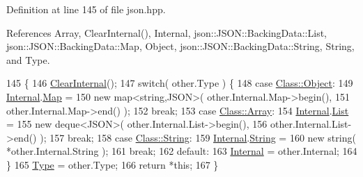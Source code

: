 Definition at line 145 of file json.\+hpp.



References Array, Clear\+Internal(), Internal, json\+::\+J\+S\+O\+N\+::\+Backing\+Data\+::\+List, json\+::\+J\+S\+O\+N\+::\+Backing\+Data\+::\+Map, Object, json\+::\+J\+S\+O\+N\+::\+Backing\+Data\+::\+String, String, and Type.


\begin{DoxyCode}
145                                              \{
146             \mbox{\hyperlink{classjson_1_1_j_s_o_n_afefdc8c18c2c40575c2c8463fbd78c67}{ClearInternal}}();
147             \textcolor{keywordflow}{switch}( other.Type ) \{
148             \textcolor{keywordflow}{case} \mbox{\hyperlink{classjson_1_1_j_s_o_n_a762f55df6d407c1af61607ed516ffe07a497031794414a552435f90151ac3b54b}{Class::Object}}:
149                 \mbox{\hyperlink{classjson_1_1_j_s_o_n_a1e2a064794c3d55c8bb8887fc5734947}{Internal}}.\mbox{\hyperlink{unionjson_1_1_j_s_o_n_1_1_backing_data_ab2e19b00745b37d2add157ff3a35c431}{Map}} = 
150                     \textcolor{keyword}{new} map<string,JSON>( other.Internal.Map->begin(),
151                                           other.Internal.Map->end() );
152                 \textcolor{keywordflow}{break};
153             \textcolor{keywordflow}{case} \mbox{\hyperlink{classjson_1_1_j_s_o_n_a762f55df6d407c1af61607ed516ffe07a4410ec34d9e6c1a68100ca0ce033fb17}{Class::Array}}:
154                 \mbox{\hyperlink{classjson_1_1_j_s_o_n_a1e2a064794c3d55c8bb8887fc5734947}{Internal}}.\mbox{\hyperlink{unionjson_1_1_j_s_o_n_1_1_backing_data_ab85f5e7ad21f9f7a5407ab73128a3ebc}{List}} = 
155                     \textcolor{keyword}{new} deque<JSON>( other.Internal.List->begin(),
156                                       other.Internal.List->end() );
157                 \textcolor{keywordflow}{break};
158             \textcolor{keywordflow}{case} \mbox{\hyperlink{classjson_1_1_j_s_o_n_a762f55df6d407c1af61607ed516ffe07a27118326006d3829667a400ad23d5d98}{Class::String}}:
159                 \mbox{\hyperlink{classjson_1_1_j_s_o_n_a1e2a064794c3d55c8bb8887fc5734947}{Internal}}.\mbox{\hyperlink{unionjson_1_1_j_s_o_n_1_1_backing_data_a883c18d113d2e55767a9530f06a9c772}{String}} = 
160                     \textcolor{keyword}{new} string( *other.Internal.String );
161                 \textcolor{keywordflow}{break};
162             \textcolor{keywordflow}{default}:
163                 \mbox{\hyperlink{classjson_1_1_j_s_o_n_a1e2a064794c3d55c8bb8887fc5734947}{Internal}} = other.Internal;
164             \}
165             \mbox{\hyperlink{classjson_1_1_j_s_o_n_a3fa6923afa41bdfe38077fbc0079aaf5}{Type}} = other.Type;
166             \textcolor{keywordflow}{return} *\textcolor{keyword}{this};
167         \}
\end{DoxyCode}
